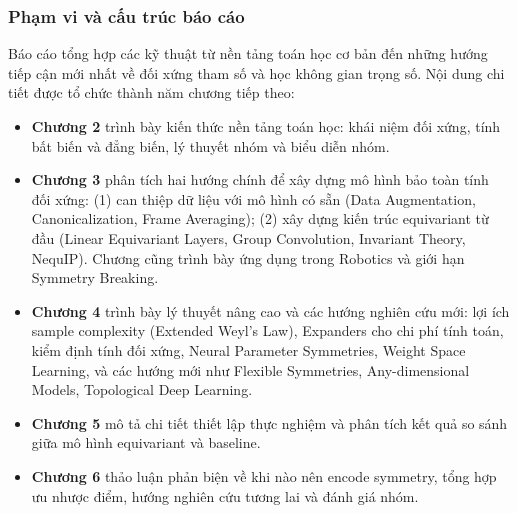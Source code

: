 \subsubsection{Phạm vi và cấu trúc báo cáo}
\label{subsubsec:pham-vi-cau-truc}

Báo cáo tổng hợp các kỹ thuật từ nền tảng toán học cơ bản đến những hướng tiếp cận mới nhất về đối xứng tham số và học không gian trọng số. Nội dung chi tiết được tổ chức thành năm chương tiếp theo:

\begin{itemize}
    \item \textbf{Chương 2} trình bày kiến thức nền tảng toán học: khái niệm đối xứng, tính bất biến và đẳng biến, lý thuyết nhóm và biểu diễn nhóm.
    \item \textbf{Chương 3} phân tích hai hướng chính để xây dựng mô hình bảo toàn tính đối xứng: (1) can thiệp dữ liệu với mô hình có sẵn (Data Augmentation, Canonicalization, Frame Averaging); (2) xây dựng kiến trúc equivariant từ đầu (Linear Equivariant Layers, Group Convolution, Invariant Theory, NequIP). Chương cũng trình bày ứng dụng trong Robotics và giới hạn Symmetry Breaking.
    \item \textbf{Chương 4} trình bày lý thuyết nâng cao và các hướng nghiên cứu mới: lợi ích sample complexity (Extended Weyl's Law), Expanders cho chi phí tính toán, kiểm định tính đối xứng, Neural Parameter Symmetries, Weight Space Learning, và các hướng mới như Flexible Symmetries, Any-dimensional Models, Topological Deep Learning.
    \item \textbf{Chương 5} mô tả chi tiết thiết lập thực nghiệm và phân tích kết quả so sánh giữa mô hình equivariant và baseline.
    \item \textbf{Chương 6} thảo luận phản biện về khi nào nên encode symmetry, tổng hợp ưu nhược điểm, hướng nghiên cứu tương lai và đánh giá nhóm.
\end{itemize}

\clearpage